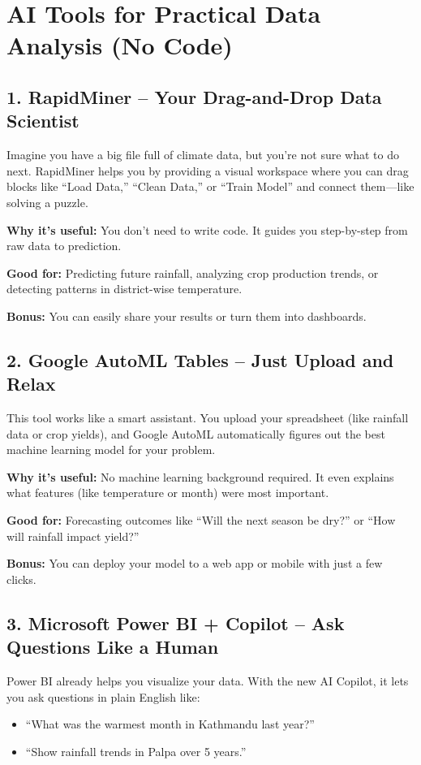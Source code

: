 \section{AI Tools for Practical Data Analysis (No Code)}

\subsection*{1. RapidMiner – Your Drag-and-Drop Data Scientist}
Imagine you have a big file full of climate data, but you're not sure what to do next. RapidMiner helps you by providing a visual workspace where you can drag blocks like “Load Data,” “Clean Data,” or “Train Model” and connect them—like solving a puzzle.

\textbf{Why it’s useful:} You don’t need to write code. It guides you step-by-step from raw data to prediction.

\textbf{Good for:} Predicting future rainfall, analyzing crop production trends, or detecting patterns in district-wise temperature.

\textbf{Bonus:} You can easily share your results or turn them into dashboards.

\subsection*{2. Google AutoML Tables – Just Upload and Relax}
This tool works like a smart assistant. You upload your spreadsheet (like rainfall data or crop yields), and Google AutoML automatically figures out the best machine learning model for your problem.

\textbf{Why it’s useful:} No machine learning background required. It even explains what features (like temperature or month) were most important.

\textbf{Good for:} Forecasting outcomes like “Will the next season be dry?” or “How will rainfall impact yield?”

\textbf{Bonus:} You can deploy your model to a web app or mobile with just a few clicks.

\subsection*{3. Microsoft Power BI + Copilot – Ask Questions Like a Human}
Power BI already helps you visualize your data. With the new AI Copilot, it lets you ask questions in plain English like:

\begin{itemize}
  \item “What was the warmest month in Kathmandu last year?”
  \item “Show rainfall trends in Palpa over 5 years.”
\end{itemize}


